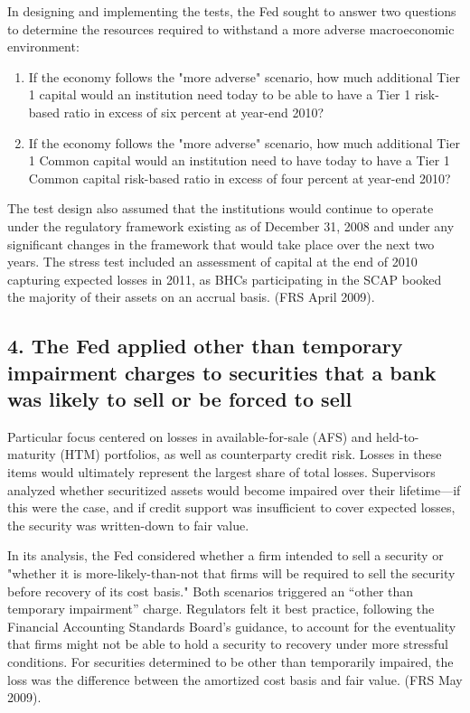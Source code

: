 \documentclass[justified, nobib]{tufte-handout2}
\begin{document}
In designing and implementing the tests, the Fed sought to answer two
questions to determine the resources required to withstand a more
adverse macroeconomic environment:

\begin{enumerate}
\def\labelenumi{\arabic{enumi}.}
\item
  If the economy follows the "more adverse" scenario, how much
  additional Tier 1 capital would an institution need today to be able
  to have a Tier 1 risk-based ratio in excess of six percent at year-end
  2010?
\item
  If the economy follows the "more adverse" scenario, how much
  additional Tier 1 Common capital would an institution need to have
  today to have a Tier 1 Common capital risk-based ratio in excess of
  four percent at year-end 2010?
\end{enumerate}

The test design also assumed that the institutions would continue to
operate under the regulatory framework existing as of December 31, 2008
and under any significant changes in the framework that would take place
over the next two years. The stress test included an assessment of
capital at the end of 2010 capturing expected losses in 2011, as BHCs
participating in the SCAP booked the majority of their assets on an
accrual basis. (FRS April 2009).

\subsection{4. The Fed applied other than temporary impairment charges to
securities that a bank was likely to sell or be forced to
sell}

Particular focus centered on losses in available-for-sale (AFS) and
held-to-maturity (HTM) portfolios, as well as counterparty credit risk.
Losses in these items would ultimately represent the largest share of
total losses. Supervisors analyzed whether securitized assets would
become impaired over their lifetime---if this were the case, and if
credit support was insufficient to cover expected losses, the security
was written-down to fair value.

In its analysis, the Fed considered whether a firm intended to sell a
security or "whether it is more-likely-than-not that firms will be
required to sell the security before recovery of its cost basis." Both
scenarios triggered an ``other than temporary impairment'' charge.
Regulators felt it best practice, following the Financial Accounting
Standards Board's guidance, to account for the eventuality that firms
might not be able to hold a security to recovery under more stressful
conditions. For securities determined to be other than temporarily
impaired, the loss was the difference between the amortized cost basis
and fair value. (FRS May 2009).
\end{document}
